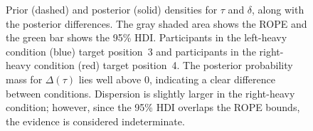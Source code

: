 \documentclass[doc,biblatex,floatsintext]{apa7}
\begin{document}
\begin{figure}
\vspace*{2pt}
\caption{Prior (dashed) and posterior (solid) densities for $\tau$ and $\delta$, along with the posterior differences. The gray shaded area shows the ROPE and the green bar shows the 95\% HDI. Participants in the left-heavy condition (blue) target position~3 and participants in the right-heavy condition (red) target position~4. The posterior probability mass for $\Delta(\tau)$ lies well above 0, indicating a clear difference between conditions. Dispersion is slightly larger in the right-heavy condition; however, since the 95\% HDI overlaps the ROPE bounds, the evidence is considered indeterminate.}
\label{fig12}
\end{figure}
\end{document}
